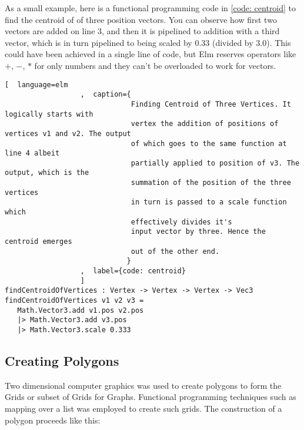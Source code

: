 As a small example, here is a functional programming code in \autoref{code:
centroid} to find the centroid of of three position vectors. You can observe
how first two vectors are added on line 3, and then it is pipelined to addition
with a third vector, which is in turn pipelined to being scaled by $0.33$
(divided by $3.0$). This could have been achieved in a single line of code, but
Elm reserves operators like $+$, $-$, $*$ for only numbers and they can't be
overloaded to work for vectors.


\begin{lstlisting}[  language=elm
                  ,  caption={
                              Finding Centroid of Three Vertices. It logically starts with
                              vertex the addition of positions of vertices v1 and v2. The output
                              of which goes to the same function at line 4 albeit
                              partially applied to position of v3. The output, which is the 
                              summation of the position of the three vertices 
                              in turn is passed to a scale function which 
                              effectively divides it's
                              input vector by three. Hence the centroid emerges
                              out of the other end.
                             }
                  ,  label={code: centroid}
                  ]
findCentroidOfVertices : Vertex -> Vertex -> Vertex -> Vec3
findCentroidOfVertices v1 v2 v3 =
   Math.Vector3.add v1.pos v2.pos
   |> Math.Vector3.add v3.pos
   |> Math.Vector3.scale 0.333
\end{lstlisting}

\subsection{Creating Polygons}
Two dimensional computer graphics was used to create polygons to form the Grids
or subset of Grids for Graphs. Functional programming techniques such as mapping
over a list was employed to create such grids. 
The construction of a polygon proceeds like this:

